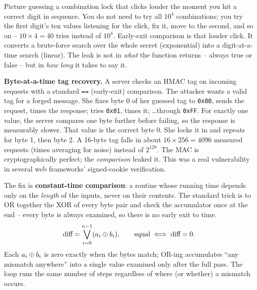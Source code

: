 \begin{intuitionbox}
Picture guessing a combination lock that clicks louder the moment you hit a correct digit in sequence. You do not need to try all $10^4$ combinations; you try the first digit's ten values listening for the click, fix it, move to the second, and so on -- $10 \times 4 = 40$ tries instead of $10^4$. Early-exit comparison is that louder click. It converts a brute-force search over the whole secret (exponential) into a digit-at-a-time search (linear). The leak is not in \emph{what} the function returns -- always true or false -- but in \emph{how long} it takes to say it.
\end{intuitionbox}

\begin{attackbox}
\textbf{Byte-at-a-time tag recovery.} A server checks an HMAC tag on incoming requests with a standard \texttt{==} (early-exit) comparison. The attacker wants a valid tag for a forged message. She fixes byte 0 of her guessed tag to \texttt{0x00}, sends the request, times the response; tries \texttt{0x01}, times it; \dots through \texttt{0xFF}. For exactly one value, the server compares one byte further before failing, so the response is measurably slower. That value is the correct byte 0. She locks it in and repeats for byte 1, then byte 2. A 16-byte tag falls in about $16 \times 256 = 4096$ measured requests (times averaging for noise) instead of $2^{128}$. The MAC is cryptographically perfect; the \emph{comparison} leaked it. This was a real vulnerability in several web frameworks' signed-cookie verification.
\end{attackbox}

\begin{whybox}
The fix is \textbf{constant-time comparison}: a routine whose running time depends only on the \emph{length} of the inputs, never on their contents. The standard trick is to OR together the XOR of every byte pair and check the accumulator once at the end -- every byte is always examined, so there is no early exit to time.
\[
\text{diff} = \bigvee_{i=0}^{n-1} (a_i \oplus b_i), \qquad \text{equal} \iff \text{diff} = 0.
\]
Each $a_i \oplus b_i$ is zero exactly when the bytes match; OR-ing accumulates ``any mismatch anywhere'' into a single value examined only after the full pass. The loop runs the same number of steps regardless of where (or whether) a mismatch occurs.
\end{whybox}

